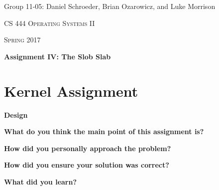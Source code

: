 \documentclass[10pt,letterpaper,draftclsnofoot,onecolumn]{IEEEtran}
\begin{document}
\begin{titlepage}
\centering
{\Large Group 11-05: Daniel Schroeder, Brian Ozarowicz, and Luke Morrison\par}
\vspace{1cm}
{\scshape\Large CS 444 Operating Systems II\par}
{\scshape\Large Spring 2017\par}
\vspace{1cm}
{\huge\bfseries Assignment IV: The Slob Slab\par}
\vspace{2cm}
\begin{abstract}
This document is a summary of Assignment 4 for CS 444 Operating Systems II at Oregon State University Spring 2017. This document includes the design and implementation of the kernel assignment to implement the Slob Slab, responses to the design and implimenation questions for the kernel and concurrency assignments, and a work log.
\end{abstract}
\end{titlepage}

\section{Kernel Assignment}
\bigskip

\noindent\textbf{Design}
\medskip

\medskip

\noindent

\bigskip

\noindent\textbf{What do you think the main point of this assignment is?}
\medskip

\medskip

\noindent
\bigskip

\noindent\textbf{How did you personally approach the problem?}
\medskip

\medskip

\noindent
\medskip

\medskip


\bigskip

\noindent\textbf{How did you ensure your solution was correct?}
\medskip

\medskip

\noindent

\bigskip

\noindent\textbf{What did you learn?}
\medskip

\medskip
\end{document}
